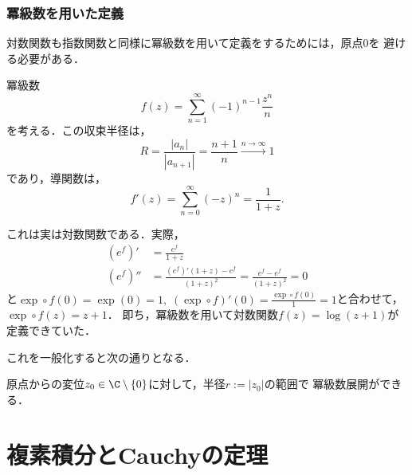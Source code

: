 \documentclass[uplatex, dvipdfmx]{jsreport}
\begin{document}
\subsection{冪級数を用いた定義}

対数関数も指数関数と同様に冪級数を用いて定義をするためには，原点$0$を
避ける必要がある．

\begin{discussion}
    冪級数
    \[ f(z)=\sum^\infty_{n=1}(-1)^{n-1}\frac{z^n}{n} \]
    を考える．この収束半径は，
    \[ R=\frac{|a_n|}{|a_{n+1}|}=\frac{n+1}{n}\xrightarrow{n\to\infty}1 \]
    であり，導関数は，
    \[  f'(z)=\sum^\infty_{n=0}(-z)^n=\frac{1}{1+z}. \]

    これは実は対数関数である．実際，
    \begin{align*}
        (e^f)' &= \frac{e^f}{1+z}\\
        (e^f)'' &= \frac{(e^f)'(1+z)-e^f}{(1+z)^2} = \frac{e^f-e^f}{(1+z)^2}=0
    \end{align*}
    と$\exp\circ f(0)=\exp(0)=1,\;(\exp\circ f)'(0)=\frac{\exp\circ f(0)}{1}=1$と合わせて，
    $\exp\circ f(z)=z+1$．
    即ち，冪級数を用いて対数関数$f(z)=\log (z+1)$が定義できていた．
\end{discussion}

これを一般化すると次の通りとなる．
\begin{definition}
    原点からの変位$z_0\in\C\setminus\{0\}$に対して，半径$r:=|z_0|$の範囲で
    冪級数展開ができる．
\end{definition}

\chapter{複素積分とCauchyの定理}
\end{document}
